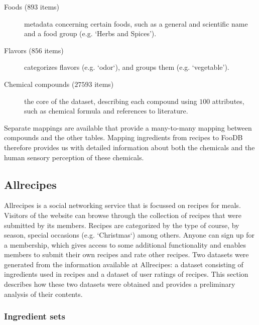 \begin{description}
	\item [Foods ($893$ items)] metadata concerning certain foods, such as a general and scientific name and a food group (e.g. `Herbs and Spices').
	\item [Flavors ($856$ items)] categorizes flavors (e.g. `odor`), and groups them (e.g. `vegetable').
	\item [Chemical compounds ($\num{27593}$ items)] the core of the dataset, describing each compound using $100$ attributes, such as chemical formula and references to literature.
\end{description}

Separate mappings are available that provide a many-to-many mapping between compounds and the other tables.
Mapping ingredients from recipes to FooDB therefore provides us with detailed information about both the chemicals and the human sensory perception of these chemicals.




\subsection{Allrecipes}
\label{subsec:allrecipes}

Allrecipes is a social networking service that is focussed on recipes for meals.
Visitors of the website can browse through the collection of recipes that were submitted by its members.
Recipes are categorized by the type of course, by season, special occasions (e.g. `Christmas`) among others.
Anyone can sign up for a membership, which gives access to some additional functionality and enables members to submit their own recipes and rate other recipes.
Two datasets were generated from the information available at Allrecipes: a dataset consisting of ingredients used in recipes and a dataset of user ratings of recipes.
This section describes how these two datasets were obtained and provides a preliminary analysis of their contents.




\subsubsection{Ingredient sets}
\label{subsubsec:ingredient_sets}

